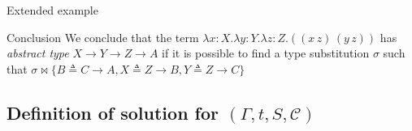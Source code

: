 \documentclass[8pt]{beamer}
\begin{document}
\begin{frame}{Extended example}
\begin{center}
\begin{overprint}
                \begin{block}{Conclusion}
                    We conclude that the term $\lambda x:X. \lambda y:Y.
                    \lambda z:Z.  ((x\, z)\, (y \, z))$ has
                    \emph{abstract type} $X
                    \rightarrow Y \rightarrow Z\rightarrow A$ if it is
                    possible to find a type substitution $\sigma$ such
                    that $\sigma \Join \{B\triangleq C\rightarrow A, X 
                    \triangleq  Z \rightarrow B, Y \triangleq  Z \rightarrow C\}$
                \end{block}
    \end{overprint}
    \end{center}
    \normalsize
\end{frame}

\subsection{Definition of solution for $(\Gamma, t, S, \mathcal{C})$}
\end{document}
